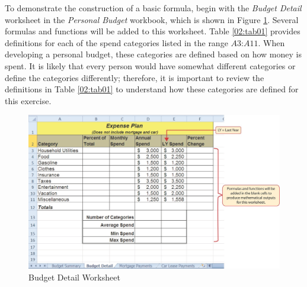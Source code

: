 To demonstrate the construction of a basic formula, begin with the \textit{Budget Detail} worksheet in the \textit{Personal Budget} workbook, which is shown in Figure \ref{02:fig02}. Several formulas and functions will be added to this worksheet. Table \ref{02:tab01} provides definitions for each of the spend categories listed in the range $ A3 $:$ A11 $. When developing a personal budget, these categories are defined based on how money is spent. It is likely that every person would have somewhat different categories or define the categories differently; therefore, it is important to review the definitions in Table \ref{02:tab01} to understand how these categories are defined for this exercise.

\begin{figure}[H]
	\centering
	\includegraphics[width=\maxwidth{.95\linewidth}]{gfx/ch02_fig02}
	\caption{Budget Detail Worksheet}
	\label{02:fig02}
\end{figure}

